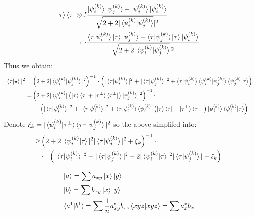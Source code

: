 \documentclass[manuscript,screen,review]{acmart}
\begin{document}
\begin{equation*}
  \begin{split}
    \ket{\tau}\bra{\tau} \otimes I & \frac{ \ket{\psi^{(k)}_{i}}\ket{\psi^{(k)}_{j}}+\ket{\psi^{(k)}_{j}}\ket{\psi^{(k)}_{i}} }{ \sqrt{2 + 2 |\braket{\psi^{(k)}_{i}|\psi^{(k)}_{j}}}|^2 } \\ 
    \mapsto &  \frac{ \braket{\tau|\psi^{(k)}_{i}}\ket{\tau}\ket{\psi^{(k)}_{j}}+\braket{\tau|\psi^{(k)}_{j}}\ket{\tau}\ket{\psi^{(k)}_{i}} }{ \sqrt{2 + 2 |\braket{\psi^{(k)}_{i}|\psi^{(k)}_{j}}}|^2 }
  \end{split}
\end{equation*}
Thus we obtain: 
\begin{equation*}
  \begin{split}
    | \braket{\tau|\star}|^{2}  = & \left(2 + 2 |\braket{\psi^{(k)}_{i}|\psi^{(k)}_{j}}|^2\right)^{-1} \cdot \left( | \braket{\tau|\psi^{(k)}_{i}}|^{2} + | \braket{\tau|\psi^{(k)}_{j}}|^{2}  + \braket{\tau|\psi^{(k)}_{i}}\braket{\psi^{(k)}_{i}|\psi^{(k)}_{j}}\braket{\psi^{(k)}_{j}|\tau}\right) \\
    = & \left(2 + 2 |\bra{\psi^{(k)}_{i}}\left( \ket{\tau}\bra{\tau}+ \ket{\tau^{\perp}}\bra{\tau^{\perp}} \right)\ket{\psi^{(k)}_{j}}|^2\right)^{-1} \cdot \\
    & \cdot \ \ \left( | \braket{\tau|\psi^{(k)}_{i}}|^{2} + | \braket{\tau|\psi^{(k)}_{j}}|^{2}  + \braket{\tau|\psi^{(k)}_{i}}\bra{\psi^{(k)}_{i}}\left( \ket{\tau}\bra{\tau}+ \ket{\tau^{\perp}}\bra{\tau^{\perp}} \right)\ket{\psi^{(k)}_{j}}\braket{\psi^{(k)}_{j}|\tau}\right) \\
  \end{split}
\end{equation*}
Denote $\xi_{k} = |\braket{\psi^{(k)}_{i}|\tau^{\perp}}\braket{\tau^{\perp}|\psi^{(k)}_{j}}|^2$ so the above simplifed into:
\begin{equation*}
  \begin{split}
    \ge & \left(2 + 2 |\braket{\psi^{(k)}_{i}|\tau}|^2|\braket{\tau|\psi^{(k)}_{j}}|^2 + \xi_{k}\right)^{-1} \cdot \\
    & \cdot \ \ \left( | \braket{\tau|\psi^{(k)}_{i}}|^{2} + | \braket{\tau|\psi^{(k)}_{j}}|^{2}  + 2 |\braket{\psi^{(k)}_{i}|\tau}|^2|\braket{\tau|\psi^{(k)}_{j}}| - \xi_{k}\right) \\
  \end{split}
\end{equation*}

\begin{equation*}
  \begin{split}
    & \ket{a} = \sum a_{xy}\ket{x}\ket{y} \\
    & \ket{b} = \sum b_{xy}\ket{x}\ket{y} \\ 
    & \braket{a^{1}|b^{1}} = \sum \frac{1}{n}a_{xy}^{*}b_{xz}\braket{xyz|xyz} = \sum a_{x}^{*}b_{x}
  \end{split}
\end{equation*}


 




\printbibliography
\end{document}
